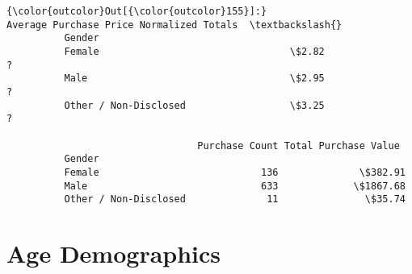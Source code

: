 \documentclass[11pt]{article}
\begin{document}
\begin{Verbatim}[commandchars=\\\{\}]
{\color{outcolor}Out[{\color{outcolor}155}]:}                       Average Purchase Price Normalized Totals  \textbackslash{}
          Gender                                                           
          Female                                 \$2.82                 ?   
          Male                                   \$2.95                 ?   
          Other / Non-Disclosed                  \$3.25                 ?   
          
                                 Purchase Count Total Purchase Value  
          Gender                                                      
          Female                            136              \$382.91  
          Male                              633             \$1867.68  
          Other / Non-Disclosed              11               \$35.74  
\end{Verbatim}
            
    \section{Age Demographics}\label{age-demographics}
\end{document}
